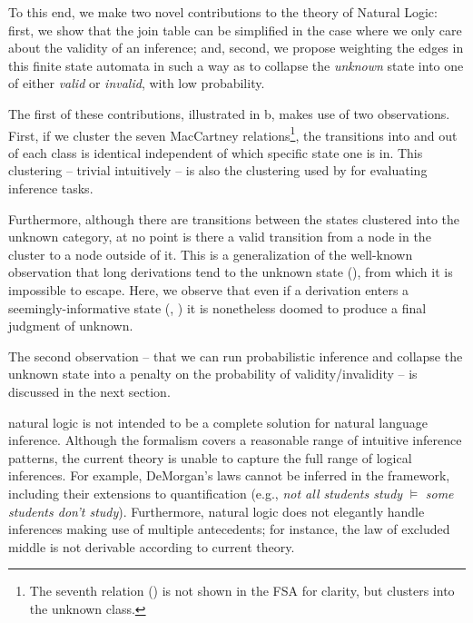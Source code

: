To this end, we make two novel contributions to the theory of Natural
  Logic:
first, we show that the join table can be simplified in the case where
  we only care about the validity of an inference; and, second, we
  propose weighting the edges in this finite state automata in such
  a way as to collapse the \textit{unknown} state into one of 
  either \textit{valid} or \textit{invalid}, with low probability.

The first of these contributions, illustrated in b,
  makes use of two observations.
First, if we cluster the seven MacCartney relations\footnote{
  The seventh relation (\independent) is not shown in the FSA for
  clarity, but clusters into the unknown class.
  }, the transitions into and out of each class is identical independent
  of which specific state one is in.
This clustering -- trivial intuitively -- is also the clustering used
  by  for evaluating inference
  tasks.

Furthermore, although there are transitions between the states clustered
  into the unknown category, at no point is there a valid transition
  from a node in the cluster to a node outside of it.
This is a generalization of the well-known observation that long
  derivations tend to the unknown state (\independent), from which
  it is impossible to escape.
Here, we observe that even if a derivation enters a seemingly-informative
  state (\reverse, \cover) it is nonetheless doomed to produce a
  final judgment of unknown.

The second observation -- that we can run probabilistic inference and
  collapse the unknown state into a penalty on the probability of
  validity/invalidity -- is discussed in the next section.

%
%
natural logic is not intended to be a complete solution for natural
  language inference.
Although the formalism covers a reasonable range of intuitive inference
  patterns, the current theory is unable to capture the full range
  of logical inferences.
For example, DeMorgan's laws 
  cannot be inferred in the framework,
  including their extensions to quantification
  (e.g., \textit{not all students study} $\models$ \textit{some students don't study}).
Furthermore, natural logic does not elegantly handle inferences
  making use of multiple antecedents; for instance, the law of
  excluded middle is not derivable according to current theory.


